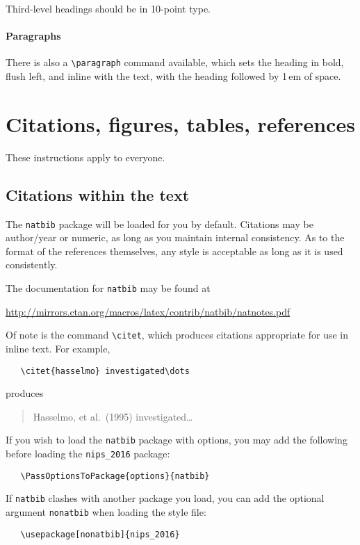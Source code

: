 \documentclass{article}
\begin{document}
Third-level headings should be in 10-point type.

\paragraph{Paragraphs}

There is also a \verb+\paragraph+ command available, which sets the
heading in bold, flush left, and inline with the text, with the
heading followed by 1\,em of space.

\section{Citations, figures, tables, references}
\label{others}

These instructions apply to everyone.

\subsection{Citations within the text}

The \verb+natbib+ package will be loaded for you by default.
Citations may be author/year or numeric, as long as you maintain
internal consistency.  As to the format of the references themselves,
any style is acceptable as long as it is used consistently.

The documentation for \verb+natbib+ may be found at
\begin{center}
  \url{http://mirrors.ctan.org/macros/latex/contrib/natbib/natnotes.pdf}
\end{center}
Of note is the command \verb+\citet+, which produces citations
appropriate for use in inline text.  For example,
\begin{verbatim}
   \citet{hasselmo} investigated\dots
\end{verbatim}
produces
\begin{quote}
  Hasselmo, et al.\ (1995) investigated\dots
\end{quote}

If you wish to load the \verb+natbib+ package with options, you may
add the following before loading the \verb+nips_2016+ package:
\begin{verbatim}
   \PassOptionsToPackage{options}{natbib}
\end{verbatim}

If \verb+natbib+ clashes with another package you load, you can add
the optional argument \verb+nonatbib+ when loading the style file:
\begin{verbatim}
   \usepackage[nonatbib]{nips_2016}
\end{verbatim}
\end{document}
